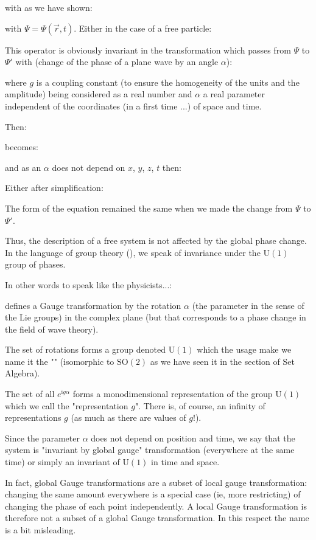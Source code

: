 	with as we have shown:
	
	with $\Psi=\Psi(\vec{r},t)$. Either in the case of a free particle:
	
	This operator is obviously invariant in the transformation which passes from $\Psi$ to $\Psi'$ with (change of the phase of a plane wave by an angle $\alpha$):
	
	where $g$ is a coupling constant (to ensure the homogeneity of the units and the amplitude) being considered as a real number and $\alpha$ a real parameter independent of the coordinates (in a first time ...) of space and time.
	
	Then:
	
	becomes:
	
	and as an $\alpha$ does not depend on $x$, $y$, $z$, $t$ then:
	
	Either after simplification:
	
	The form of the equation remained the same when we made the change from $\Psi$ to $\Psi'$.
	
	Thus, the description of a free system is not affected by the global phase change. In the language of group theory (), we speak of invariance under the $\text{U}(1)$ group of  phases.

	In other words to speak like the physicists...:
	
	defines a Gauge transformation by the rotation $\alpha$ (the parameter in the sense of the Lie groups) in the complex plane (but that corresponds to a phase change in the field of wave theory).
	
	The set of rotations forms a group denoted $\text{U}(1)$ which the usage make we name it the "" (isomorphic to $\text{SO}(2)$ as we have seen it in the section of Set Algebra).
	
	The set of all $e^{\mathrm{i}g\alpha}$ forms a monodimensional representation of the group $\text{U}(1)$ which we call the "representation $g$". There is, of course, an infinity of representations $g$ (as much as there are values of $g$!).
	
	Since the parameter $\alpha$ does not depend on position and time, we say that the system is "invariant by global gauge" transformation (everywhere at the same time) or simply an invariant of $\text{U}(1)$ in time and space.
	
	\begin{tcolorbox}[title=Remark,colframe=black,arc=10pt]
	In fact, global Gauge transformations are a subset of local gauge transformation: changing the same amount everywhere is a special case (ie, more restricting) of changing the phase of each point independently. A local Gauge transformation is therefore not a subset of a global Gauge transformation. In this respect the name is a bit misleading.
	\end{tcolorbox}
	
